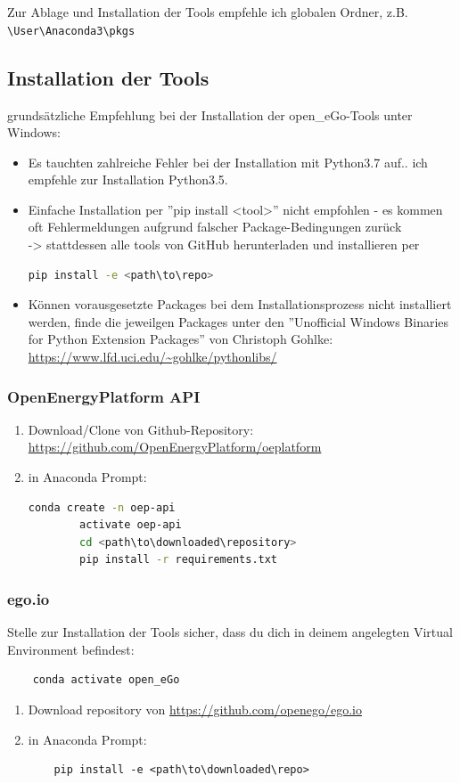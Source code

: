 \documentclass[
a4paper,     %
12pt         %
]{scrartcl}  %
\begin{document}
Zur Ablage und Installation der Tools empfehle ich globalen Ordner, z.B.
\texttt{ \textbackslash User\textbackslash Anaconda3\textbackslash pkgs}

\subsection{Installation der Tools}
grundsätzliche Empfehlung bei der Installation der open\_eGo-Tools unter Windows:
\begin{itemize}
\item Es tauchten zahlreiche Fehler bei der Installation mit Python3.7 auf.. ich empfehle zur Installation Python3.5.
\item Einfache Installation per ''pip install <tool>'' nicht empfohlen - es kommen oft Fehlermeldungen aufgrund falscher Package-Bedingungen zurück\\
-> stattdessen alle tools von GitHub herunterladen und installieren per
 \begin{lstlisting}[language=bash]
 pip install -e <path\to\repo>
 \end{lstlisting}

\item Können vorausgesetzte Packages bei dem Installationsprozess nicht installiert werden, finde die jeweilgen Packages unter den ''Unofficial Windows Binaries for Python Extension Packages'' von Christoph Gohlke:
\url{https://www.lfd.uci.edu/~gohlke/pythonlibs/}
\end{itemize}

\subsubsection{OpenEnergyPlatform API}
\begin{enumerate}
	\item Download/Clone von Github-Repository: \url{https://github.com/OpenEnergyPlatform/oeplatform}
	\item in Anaconda Prompt:
	\begin{lstlisting}[language=bash]
		conda create -n oep-api
		activate oep-api
		cd <path\to\downloaded\repository>
		pip install -r requirements.txt
	\end{lstlisting}
\end{enumerate}

\subsubsection{ego.io}
Stelle zur Installation der Tools sicher, dass du dich in deinem angelegten Virtual Environment befindest:
\begin{lstlisting}
	conda activate open_eGo
\end{lstlisting}
\begin{enumerate}
	\item Download repository von \url{https://github.com/openego/ego.io}
	\item in Anaconda Prompt:
\begin{lstlisting}
	pip install -e <path\to\downloaded\repo>
\end{lstlisting}
\end{enumerate}
\end{document}
